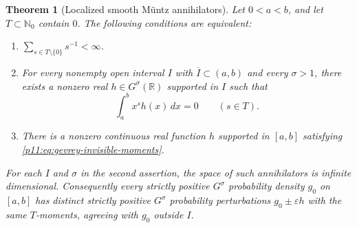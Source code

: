 \documentclass[11pt,letterpaper]{article}
\newtheorem{theorem}{Theorem}[section]
\theoremstyle{definition}
\theoremstyle{remark}
\newcommand{\1}{\mathbf 1}
\begin{document}
\begin{theorem}[Localized smooth M\"untz annihilators]\label{p11:thm:smooth-witness}
Let $0<a<b$, and let $T\subset\mathbb N_0$ contain $0$. The following
conditions are equivalent:
\begin{enumerate}
\item $\displaystyle\sum_{s\in T\setminus\{0\}}s^{-1}<\infty$.
\item For every nonempty open interval $I$ with
$\overline I\subset(a,b)$ and every $\sigma>1$, there exists a nonzero
real $h\in G^\sigma(\mathbb R)$ supported in $I$ such that
\begin{equation}\label{p11:eq:gevrey-invisible-moments}
 \int_a^b x^s h(x)\,dx=0\qquad(s\in T).
\end{equation}
\item There is a nonzero continuous real function $h$ supported in
$[a,b]$ satisfying \eqref{p11:eq:gevrey-invisible-moments}.
\end{enumerate}
For each $I$ and $\sigma$ in the second assertion, the space of such
annihilators is infinite dimensional. Consequently every strictly positive
$G^\sigma$ probability density $g_0$ on $[a,b]$ has distinct strictly
positive $G^\sigma$ probability perturbations $g_0\pm\varepsilon h$ with
the same $T$-moments, agreeing with $g_0$ outside $I$.
\end{theorem}
\end{document}
